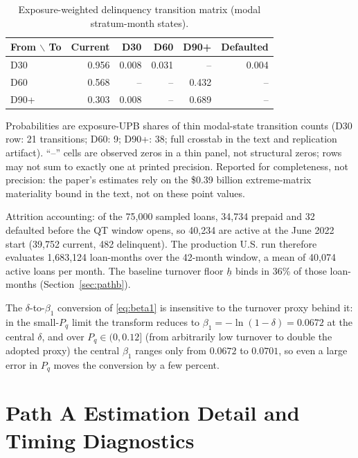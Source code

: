 \documentclass[12pt]{article}
\begin{document}
\begin{table}[H]
\centering
\small
\begin{threeparttable}
\caption{Exposure-weighted delinquency transition matrix (modal stratum-month states).}
\label{tab:delinq}
\begin{tabular}{@{}lrrrrr@{}}
\toprule
From $\backslash$ To & Current & D30 & D60 & D90+ & Defaulted \\
\midrule
D30 & 0.956 & 0.008 & 0.031 & -- & 0.004 \\
D60 & 0.568 & -- & -- & 0.432 & -- \\
D90+ & 0.303 & 0.008 & -- & 0.689 & -- \\
\bottomrule
\end{tabular}
\begin{tablenotes}[flushleft]\footnotesize
\item Probabilities are exposure-UPB shares of thin modal-state transition counts (D30 row: 21 transitions; D60: 9; D90+: 38; full crosstab in the text and replication artifact). ``--'' cells are observed zeros in a thin panel, not structural zeros; rows may not sum to exactly one at printed precision. Reported for completeness, not precision: the paper's estimates rely on the \$0.39 billion extreme-matrix materiality bound in the text, not on these point values.
\end{tablenotes}
\end{threeparttable}
\end{table}
Attrition accounting: of the 75,000 sampled loans, 34,734 prepaid and 32 defaulted before the QT window opens, so 40,234 are active at the June 2022 start (39,752 current, 482 delinquent). The production U.S. run therefore evaluates 1,683,124 loan-months over the 42-month window, a mean of 40,074 active loans per month. The baseline turnover floor $\underline{h}$ binds in 36\% of those loan-months (Section~\ref{sec:pathb}).

The $\delta$-to-$\beta_1$ conversion of \eqref{eq:beta1} is insensitive to the turnover proxy behind it: in the small-$P_q$ limit the transform reduces to $\beta_1 = -\ln(1-\delta) = 0.0672$ at the central $\delta$, and over $P_q \in (0, 0.12]$ (from arbitrarily low turnover to double the adopted proxy) the central $\beta_1$ ranges only from $0.0672$ to $0.0701$, so even a large error in $P_q$ moves the conversion by a few percent.

\section{Path A Estimation Detail and Timing Diagnostics}\label{app:patha-detail}
\end{document}
